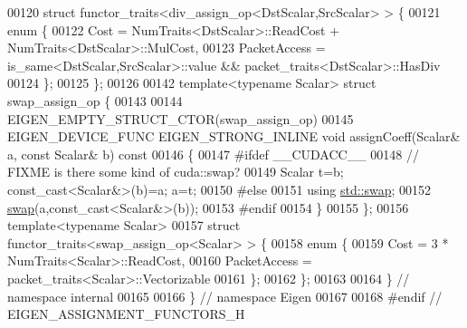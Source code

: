 \begin{DoxyCode}
00120 \textcolor{keyword}{struct }functor\_traits<div\_assign\_op<DstScalar,SrcScalar> > \{
00121   \textcolor{keyword}{enum} \{
00122     Cost = NumTraits<DstScalar>::ReadCost + NumTraits<DstScalar>::MulCost,
00123     PacketAccess = is\_same<DstScalar,SrcScalar>::value && packet\_traits<DstScalar>::HasDiv
00124   \};
00125 \};
00126 
00142 \textcolor{keyword}{template}<\textcolor{keyword}{typename} Scalar> \textcolor{keyword}{struct }swap\_assign\_op \{
00143 
00144   EIGEN\_EMPTY\_STRUCT\_CTOR(swap\_assign\_op)
00145   EIGEN\_DEVICE\_FUNC EIGEN\_STRONG\_INLINE \textcolor{keywordtype}{void} assignCoeff(Scalar& a, \textcolor{keyword}{const} Scalar& b)\textcolor{keyword}{ const}
00146 \textcolor{keyword}{  }\{
00147 \textcolor{preprocessor}{#ifdef \_\_CUDACC\_\_}
00148     \textcolor{comment}{// FIXME is there some kind of cuda::swap?}
00149     Scalar t=b; \textcolor{keyword}{const\_cast<}Scalar&\textcolor{keyword}{>}(b)=a; a=t;
00150 \textcolor{preprocessor}{#else}
00151     \textcolor{keyword}{using} \hyperlink{endian_8c_a3ca5ecd34b04d6a243c054ac3a57f68d}{std::swap};
00152     \hyperlink{endian_8c_a3ca5ecd34b04d6a243c054ac3a57f68d}{swap}(a,const\_cast<Scalar&>(b));
00153 \textcolor{preprocessor}{#endif}
00154   \}
00155 \};
00156 \textcolor{keyword}{template}<\textcolor{keyword}{typename} Scalar>
00157 \textcolor{keyword}{struct }functor\_traits<swap\_assign\_op<Scalar> > \{
00158   \textcolor{keyword}{enum} \{
00159     Cost = 3 * NumTraits<Scalar>::ReadCost,
00160     PacketAccess = packet\_traits<Scalar>::Vectorizable
00161   \};
00162 \};
00163 
00164 \} \textcolor{comment}{// namespace internal}
00165 
00166 \} \textcolor{comment}{// namespace Eigen}
00167 
00168 \textcolor{preprocessor}{#endif // EIGEN\_ASSIGNMENT\_FUNCTORS\_H}
\end{DoxyCode}
